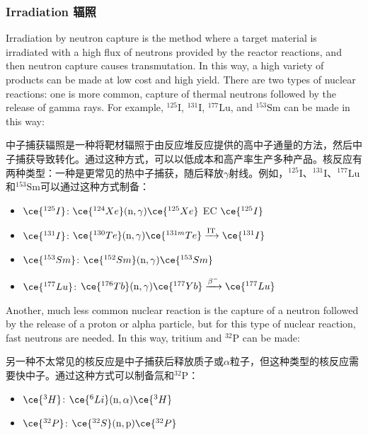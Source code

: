\documentclass[dvipsnames, svgnames,a4paper,11pt]{article}
\begin{document}
\subsubsection{Irradiation 辐照}

Irradiation by neutron capture is the method where a target material is irradiated with a high flux of neutrons provided by the reactor reactions, and then neutron capture causes transmutation. In this way, a high variety of products can be made at low cost and high yield. There are two types of nuclear reactions: one is more common, capture of thermal neutrons followed by the release of gamma rays. For example, ${}^\text{125}\text{I}$, ${}^\text{131}\text{I}$, ${}^\text{177}\text{Lu}$, and ${}^\text{153}\text{Sm}$ can be made in this way:

中子捕获辐照是一种将靶材辐照于由反应堆反应提供的高中子通量的方法，然后中子捕获导致转化。通过这种方式，可以以低成本和高产率生产多种产品。核反应有两种类型：一种是更常见的热中子捕获，随后释放$\gamma$射线。例如，${}^\text{125}\text{I}$、${}^\text{131}\text{I}$、${}^\text{177}\text{Lu}$和${}^\text{153}\text{Sm}$可以通过这种方式制备：

\begin{itemize}
    \item \(\ce{^{125}I}\): \(\ce{^{124}Xe} (\text{n}, \gamma) \ce{^{125}Xe}\) EC \(\ce{^{125}I}\)
    
    \item \(\ce{^{131}I}\): \(\ce{^{130}Te} (\text{n}, \gamma) \ce{^{131m}Te} \xrightarrow{\text{IT}} \ce{^{131}I}\)
    
    \item \(\ce{^{153}Sm}\): \(\ce{^{152}Sm} (\text{n}, \gamma) \ce{^{153}Sm}\)
    
    \item \(\ce{^{177}Lu}\): \(\ce{^{176}Tb} (\text{n}, \gamma) \ce{^{177}Yb} \xrightarrow{\beta^-} \ce{^{177}Lu}\)
  \end{itemize}
  

Another, much less common nuclear reaction is the capture of a neutron followed by the release of a proton or alpha particle, but for this type of nuclear reaction, fast neutrons are needed. In this way, tritium and ${}^\text{32}\text{P}$ can be made:

另一种不太常见的核反应是中子捕获后释放质子或$\alpha$粒子，但这种类型的核反应需要快中子。通过这种方式可以制备氚和${}^\text{32}\text{P}$：

\begin{itemize}
    \item \(\ce{^{3}H}\): \(\ce{^{6}Li} (\text{n}, \alpha) \ce{^{3}H}\)
    
    \item \(\ce{^{32}P}\): \(\ce{^{32}S} (\text{n}, \text{p}) \ce{^{32}P}\)
  \end{itemize}
  
\end{document}
